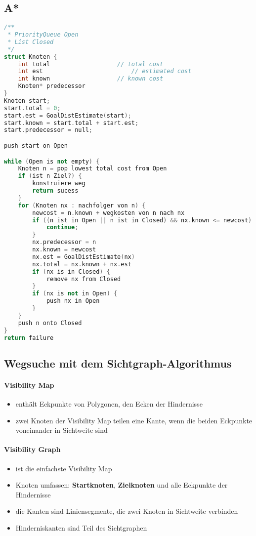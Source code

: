 \subsection{A*}
\begin{lstlisting}[language=c++]
/**
 * PriorityQueue Open
 * List Closed
 */
struct Knoten {
	int total 					// total cost
	int est							// estimated cost
	int known 					// known cost
	Knoten* predecessor
}
Knoten start;
start.total = 0;
start.est = GoalDistEstimate(start);
start.known = start.total + start.est;
start.predecessor = null;

push start on Open

while (Open is not empty) {
	Knoten n = pop lowest total cost from Open
	if (ist n Ziel?) {
		konstruiere weg
		return sucess
	}
	for (Knoten nx : nachfolger von n) {
		newcost = n.known + wegkosten von n nach nx
		if ((n ist in Open || n ist in Closed) && nx.known <= newcost) {
			continue;
		}
		nx.predecessor = n
		nx.known = newcost
		nx.est = GoalDistEstimate(nx)
		nx.total = nx.known + nx.est
		if (nx is in Closed) {
			remove nx from Closed
		}
		if (nx is not in Open) {
			push nx in Open
		}
	}
	push n onto Closed
}
return failure
\end{lstlisting}

\subsection{Wegsuche mit dem Sichtgraph-Algorithmus}
\paragraph{Visibility Map}
\begin{itemize}
	\item enthält Eckpunkte von Polygonen, den Ecken der Hindernisse
	\item zwei Knoten der Visibility Map teilen eine Kante, wenn die beiden Eckpunkte voneinander in Sichtweite sind
\end{itemize}
\paragraph{Visibility Graph}
\begin{itemize}
	\item ist die einfachste Visibility Map
	\item Knoten umfassen: \textbf{Startknoten}, \textbf{Zielknoten} und alle Eckpunkte der Hindernisse
	\item die Kanten sind Liniensegmente, die zwei Knoten in Sichtweite verbinden
	\item Hinderniskanten sind Teil des Sichtgraphen
\end{itemize}
